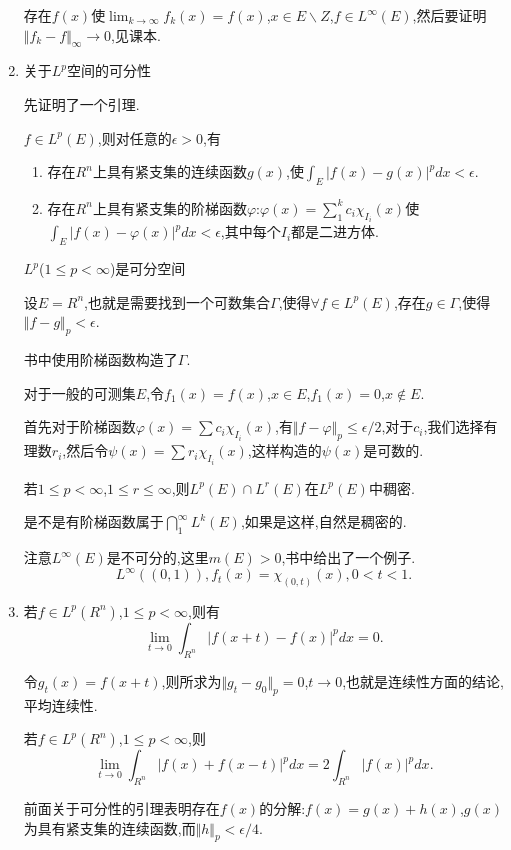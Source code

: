 \documentclass[12pt,a4paper,openany]{book}
\begin{document}
\begin{enumerate}
存在$f(x)$使$\lim_{k \rightarrow \infty}{f_k(x)}=f(x)$,$x \in E \backslash Z$,$f \in L^{\infty}(E)$,然后要证明$\Vert{f_k-f}\Vert_{\infty} \rightarrow 0$,见课本.

\item 关于$L^p$空间的可分性

先证明了一个引理.

$f \in L^p(E)$,则对任意的$\epsilon>0$,有
\begin{enumerate}
\item 存在$R^n$上具有紧支集的连续函数$g(x)$,使$\int_{E}{|f(x)-g(x)|^pdx}<\epsilon$.
\item 存在$R^n$上具有紧支集的阶梯函数$\varphi$:$\varphi(x)=\sum_{1}^{k}{c_i\chi_{I_i}(x)}$使$\int_{E}{|f(x)-\varphi(x)|^pdx}<\epsilon$,其中每个$I_i$都是二进方体.
\end{enumerate}

$L^p$($1 \le p < \infty$)是可分空间

设$E=R^n$,也就是需要找到一个可数集合$\Gamma$,使得$\forall f \in L^p(E)$,存在$g \in \Gamma$,使得$\Vert{f-g}\Vert_p<\epsilon$.

书中使用阶梯函数构造了$\Gamma$.

对于一般的可测集$E$,令$f_1(x)=f(x)$,$x \in E$,$f_1(x)=0$,$x \notin E$.

首先对于阶梯函数$\varphi(x)=\sum{c_i\chi_{I_i}(x)}$,有$\Vert{f-\varphi}\Vert_p \le \epsilon/2$,对于$c_i$,我们选择有理数$r_i$,然后令$\psi(x)=\sum{r_i\chi_{I_i}(x)}$,这样构造的$\psi(x)$是可数的.

若$1 \le p <\infty$,$1 \le r \le \infty$,则$L^p(E) \cap L^r(E)$在$L^p(E)$中稠密.

是不是有阶梯函数属于$\bigcap_{1}^{\infty}{L^k(E)}$,如果是这样,自然是稠密的.

注意$L^{\infty}(E)$是不可分的,这里$m(E)>0$,书中给出了一个例子.
\[
L^{\infty}((0,1)),f_t(x)=\chi_{(0,t)}(x),0<t<1.
\]

\item 若$f \in L^p(R^n)$,$1 \le p < \infty$,则有
\[
\lim_{t \rightarrow 0}{\int_{R^n}{|f(x+t)-f(x)|^pdx}} = 0.
\]

令$g_t(x)=f(x+t)$,则所求为$\Vert{g_t-g_0}\Vert_p=0$,$t \rightarrow 0$,也就是连续性方面的结论,平均连续性.

若$f \in L^p(R^n)$,$1 \le p < \infty$,则
\[
\lim_{t \rightarrow 0}{\int_{R^n}{|f(x)+f(x-t)|^pdx}}=2\int_{R^n}{|f(x)|^pdx}.
\]

前面关于可分性的引理表明存在$f(x)$的分解:$f(x)=g(x)+h(x)$,$g(x)$为具有紧支集的连续函数,而$\Vert{h}\Vert_p<\epsilon/4$.


\end{enumerate}
\end{document}
